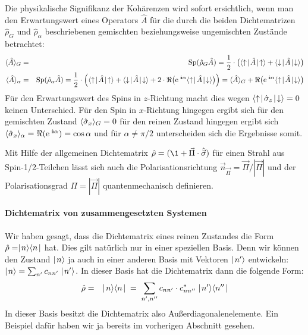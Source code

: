 Die physikalische Signifikanz der Kohärenzen wird sofort ersichtlich, wenn man den Erwartungswert eines Operators $\hat{A}$ für die durch die beiden Dichtematrizen $\hat{\rho}_G$ und $\hat{\rho}_{\alpha}$ beschriebenen gemischten beziehungsweise ungemischten Zustände betrachtet: 
\begin{eqnarray*}
	\EW{\hat{A}}_G &=& \Sp(\hat{\rho}_G\hat{A}) = \frac{1}{2}\cdot\big(\bracket{\uparrow}{\hat{A}}{\uparrow}+\bracket{\downarrow}{\hat{A}}{\downarrow}\big) 
	\\
	\EW{\hat{A}}_{\alpha} &=& \Sp(\hat{\rho}_{\alpha}\hat{A}) = \frac{1}{2}\cdot\Big(\bracket{\uparrow}{\hat{A}}{\uparrow}+\bracket{\downarrow}{\hat{A}}{\downarrow} + 2\cdot\Re\big(\e^{\;\I\alpha}\bracket{\uparrow}{\hat{A}}{\downarrow}\big)\Big) = \EW{\hat{A}}_G+\Re\big(\e^{\;\I\alpha}\bracket{\uparrow}{\hat{A}}{\downarrow}\big)
\end{eqnarray*}
Für den Erwartungswert des Spins in $z$-Richtung macht dies wegen $\bracket{\uparrow}{\hat{\sigma}_z}{\downarrow}=0$ keinen Unterschied. Für den Spin in $x$-Richtung hingegen ergibt sich für den gemischten Zustand $\langle\!\!\,\,\hat{\sigma}_x\!\!\,\,\rangle_G=0$ für den reinen Zustand hingegen ergibt sich $\EW{\hat{\sigma}_x}_{\alpha}=\Re(\e^{\;\I\alpha})=\cos\alpha$ und für $\alpha\neq\pi/2$ unterscheiden sich die Ergebnisse somit. 

Mit Hilfe der allgemeinen Dichtematrix $\hat{\rho}=(\1+\vec{\Pi}\cdot\hat{\vec{\sigma}})$ für einen Strahl aus Spin-1/2-Teilchen lässt sich auch die Polarisationsrichtung $\vec{n}_{\vec{\Pi}}=\vec{\Pi}/|\vec{\Pi}|$ und der Polarisationsgrad $\Pi=|\vec{\Pi}|$ quantenmechanisch definieren. 


\paragraph{Dichtematrix von zusammengesetzten Systemen}

Wir haben gesagt, dass die Dichtematrix eines reinen Zustandes die Form $\hat{\rho}=\mid\!\!\!\,\,{n}\rangle\langle{n}\!\!\!\,\,\mid$ hat. Dies gilt natürlich nur in einer speziellen Basis. Denn wir können den Zustand $\mid\!\!\!\,\,{n}\rangle$ ja auch in einer anderen Basis mit Vektoren $\mid\!\!\!\,\,{n'}\rangle$ entwickeln: $\mid\!\!\!\,\,{n}\rangle=\sum_{n'} c_{nn'} \mid\!\!\!\,\,{n'}\rangle$. In dieser Basis hat die Dichtematrix dann die folgende Form: 
\begin{eqnarray*}
	\hat{\rho} &=& \ket{n}\bra{n} \;\;=\; \sum_{n',n''} c_{nn'}\cdot c^*_{nn''} \ket{n'}\bra{n''}
\end{eqnarray*}
In dieser Basis besitzt die Dichtematrix also Außerdiagonalenelemente. Ein Beispiel dafür haben wir ja bereits im vorherigen Abschnitt gesehen. 

